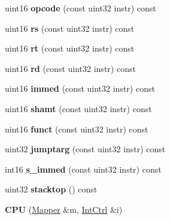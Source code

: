 \begin{DoxyCompactItemize}
\item 
\hypertarget{classCPU_a7e03d573f476dd6b729afed1c7c9085c}{
uint16 {\bfseries opcode} (const uint32 instr) const }
\label{classCPU_a7e03d573f476dd6b729afed1c7c9085c}

\item 
\hypertarget{classCPU_a6a41d0dbc478e502ef7cb599e52a17cc}{
uint16 {\bfseries rs} (const uint32 instr) const }
\label{classCPU_a6a41d0dbc478e502ef7cb599e52a17cc}

\item 
\hypertarget{classCPU_a9697aa735fc4033872a5a6702e6fb60b}{
uint16 {\bfseries rt} (const uint32 instr) const }
\label{classCPU_a9697aa735fc4033872a5a6702e6fb60b}

\item 
\hypertarget{classCPU_a04e2dcd4a7db27fde59a4a8bad328aa3}{
uint16 {\bfseries rd} (const uint32 instr) const }
\label{classCPU_a04e2dcd4a7db27fde59a4a8bad328aa3}

\item 
\hypertarget{classCPU_a30a56a622f0b0330a0623cce118bfa57}{
uint16 {\bfseries immed} (const uint32 instr) const }
\label{classCPU_a30a56a622f0b0330a0623cce118bfa57}

\item 
\hypertarget{classCPU_a71d0d69f2f7099a062379c1fa464eb43}{
uint16 {\bfseries shamt} (const uint32 instr) const }
\label{classCPU_a71d0d69f2f7099a062379c1fa464eb43}

\item 
\hypertarget{classCPU_a8625d083f6783d5f7a46fce21f405441}{
uint16 {\bfseries funct} (const uint32 instr) const }
\label{classCPU_a8625d083f6783d5f7a46fce21f405441}

\item 
\hypertarget{classCPU_a442c4dff6234e6c2476d19c0cdd8fdab}{
uint32 {\bfseries jumptarg} (const uint32 instr) const }
\label{classCPU_a442c4dff6234e6c2476d19c0cdd8fdab}

\item 
\hypertarget{classCPU_a20fac2a174c994dc0e85e3896fab07f7}{
int16 {\bfseries s\_\-immed} (const uint32 instr) const }
\label{classCPU_a20fac2a174c994dc0e85e3896fab07f7}

\item 
\hypertarget{classCPU_a9545138874d05b828db69651ba74d04e}{
uint32 {\bfseries stacktop} () const }
\label{classCPU_a9545138874d05b828db69651ba74d04e}

\item 
\hypertarget{classCPU_a6b45c2cd1ca67d3a7a9af544c49628e8}{
{\bfseries CPU} (\hyperlink{classMapper}{Mapper} \&m, \hyperlink{classIntCtrl}{IntCtrl} \&i)}
\label{classCPU_a6b45c2cd1ca67d3a7a9af544c49628e8}


\end{DoxyCompactItemize}
